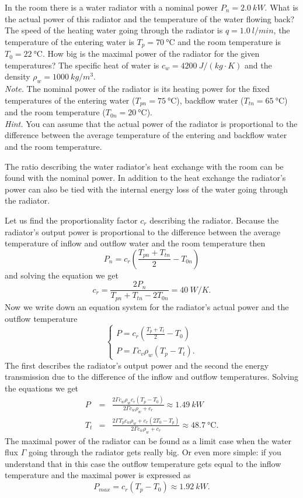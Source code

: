 In the room there is a water radiator with a nominal power $P_{n}=\SI{2.0}{kW}$. What is the actual power of this radiator and the temperature of the water flowing back? The speed of the heating water going through the radiator is $q=\SI{1.0}{l/min}$, the temperature of the entering water is $T_{p}=\SI{70}{\degreeCelsius}$ and the room temperature is $T_{0}=\SI{22}{\degreeCelsius}$.  How big is the maximal power of the radiator for the given temperatures? The specific heat of water is $c_{w}=\SI{4200}{J/\left(kg\cdot K\right)}$ and the density $\rho_{w}=\SI{1000}{kg/m^{3}}$.\\ 
\emph{Note.} The nominal power of the radiator is its heating power for the fixed temperatures of the entering water ($T_{pn}=\SI{75}{\degreeCelsius}$), backflow water ($T_{tn}=\SI{65}{\degreeCelsius}$) and the room temperature ($T_{0n}=\SI{20}{\degreeCelsius}$).\\
\emph{Hint.} You can assume that the actual power of the radiator is proportional to the difference between the average temperature of the entering and backflow water and the room temperature.

\hinteng
The ratio describing the water radiator’s heat exchange with the room can be found with the nominal power. In addition to the heat exchange the radiator’s power can also be tied with the internal energy loss of the water going through the radiator. 

\solueng
Let us find the proportionality factor $c_{r}$ describing the radiator. Because the radiator’s output power is proportional to the difference between the average temperature of inflow and outflow water and the room temperature then
\[
P_{n}=c_{r}\left(\frac{T_{pn}+T_{tn}}{2}-T_{0n}\right)
\]
and solving the equation we get
\[
c_{r}=\frac{2P_{n}}{T_{pn}+T_{tn}-2T_{0n}}=\SI{40}{W/K}.
\]
Now we write down an equation system for the radiator’s actual power and the outflow temperature
\[
\left\{ \begin{array}{c}
P=c_{r}\left(\frac{T_{p}+T_{t}}{2}-T_{0}\right)\\
P=\Gamma c_{v}\rho_{w}\left(T_{p}-T_{t}\right).
\end{array}\right.
\]
The first describes the radiator’s output power and the second the energy transmission due to the difference of the inflow and outflow temperatures. Solving the equations we get
\begin{eqnarray*}
P & = & \frac{2\Gamma c_{w}\rho_{w}c_{r}\left(T_{p}-T_{0}\right)}{2\Gamma c_{w}\rho_{w}+c_{r}}\approx\SI{1.49}{kW}\\
T_{t} & = & \frac{2\Gamma T_{p}c_{w}\rho_{w}+c_{r}\left(2T_{0}-T_{p}\right)}{2\Gamma c_{w}\rho_{w}+c_{r}}\approx\SI{48.7}{\degreeCelsius}.
\end{eqnarray*}
The maximal power of the radiator can be found as a limit case when the water flux $\Gamma$ going through the radiator gets really big. Or even more simple: if you understand that in this case the outflow temperature gets equal to the inflow temperature and the maximal power is expressed as 
\[
P_{max}=c_{r}\left(T_{p}-T_{0}\right)\approx\SI{1.92}{kW}.
\]
\probend